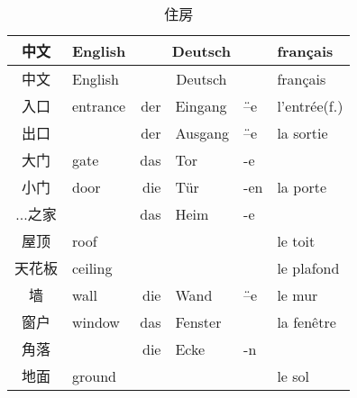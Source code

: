 \documentclass[12pt,A4paper,oneside,reqno]{amsart}
\numberwithin{equation}{section}
\theoremstyle{plain}
\theoremstyle{plain}
\theoremstyle{plain}
\numberwithin{equation}{section}
\theoremstyle{remark}
\begin{document}
\begin{longtable}{c|l|rll|l}
	\hline
	中文	&	English	&\multicolumn{3}{c|}{Deutsch} &	français  	\\
	\hline
	\endhead
	\hline
	中文	&	English	&\multicolumn{3}{c|}{Deutsch} &	français  	\\
	\hline
	\endfirsthead	
	\hline
	\endfoot
	\hline	
	\caption{住房}
	\endlastfoot				
入口	&	entrance	&	der	&	Eingang	&	\"{--}e	&	l'entr\'{e}e(f.)	\\
出口	&		&	der	&	Ausgang	&	\"{--}e	&	la sortie	\\
大门	&	gate	&	das	&	Tor	&	-e	&		\\
小门	&	door	&	die	&	T\"{u}r	&	-en	&	la porte	\\
...之家	&		&	das	&	Heim	&	-e	&		\\
屋顶	&	roof	&		&		&		&	le toit	\\
天花板	&	ceiling	&		&		&		&	le plafond	\\
墙	&	wall	&	die	&	Wand	&	\"{--}e	&	le mur	\\
窗户	&	window	&	das	&	Fenster	&		&	la fen\^{e}tre	\\
角落	&		&	die	&	Ecke	&	-n	&		\\
地面	&	ground	&		&		&		&	le sol	\\

	
	
\end{longtable}
\end{document}
